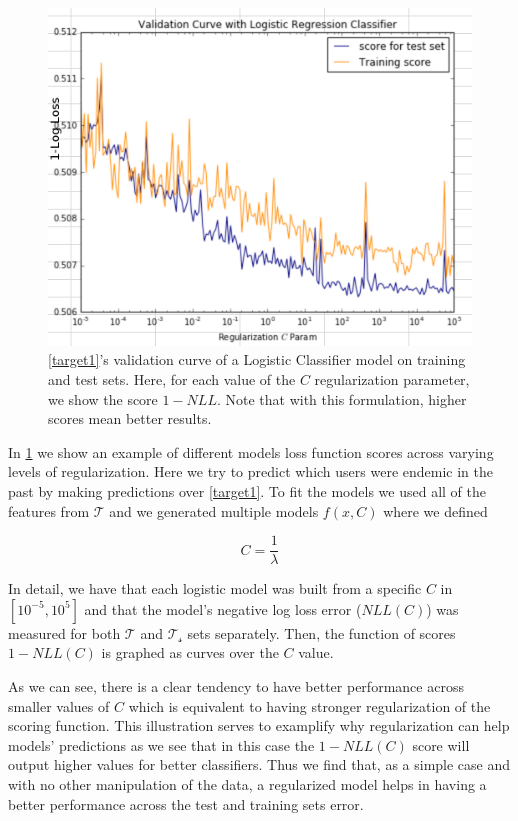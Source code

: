
\begin{figure}[h!]
\begin{center}
\includegraphics[width=0.9\columnwidth]{figures/regularization/figure-log_loss_error_validation_curve.png}
\caption{ \cref{target1}'s validation curve of a Logistic Classifier model on training and test sets. Here, for each value of the $C$ regularization parameter, we show the score $1 - NLL$. Note that with this formulation, higher scores mean better results.}
\label{fig:log_loss_regularization_validation_curve}
\end{center}
\end{figure}

In \cref{fig:log_loss_regularization_validation_curve} we show an example of different models loss function scores across varying levels of regularization.
Here we try to predict which users were endemic in the past by making predictions over \cref{target1}.
To fit the models we used all of the features from $\mathcal{T}$ and we generated multiple models $f(x,C)$ where we defined

$$C = \frac{1}{\lambda} $$

In detail, we have that each logistic model was built from a specific $C$ in  $[10^{-5},10^5]$ and that the model's negative log loss error ($NLL(C)$) was measured for both $\mathcal{T}$ and $\mathcal{T_s}$ sets separately.
Then, the function of scores $1-NLL(C)$ is graphed as curves over the $C$ value.

As we can see, there is a clear tendency to have better performance across smaller values of $C$ which is equivalent to having stronger regularization of the scoring function.
This illustration serves to examplify why regularization can help models' predictions as we see that in this case the $1-NLL(C)$ score will output higher values for better classifiers.
Thus we find that, as a simple case and with no other manipulation of the data, a regularized model helps in having a better performance across the test and training sets error.


